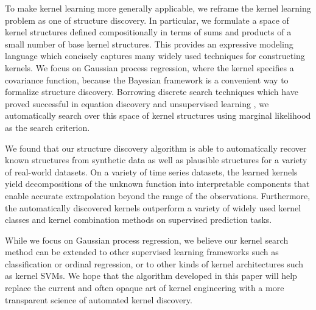 \documentclass[twoside]{article}
\renewcommand{\fTBD}[1]{}
\begin{document}
To make kernel learning more generally applicable, we reframe the kernel learning problem as one of structure discovery.
In particular, we formulate a space of kernel structures defined compositionally in terms of sums and products of a small number of base kernel structures\fTBD{Structures or families?}.
This provides an expressive modeling language which concisely captures many widely used techniques for constructing kernels.
We focus on Gaussian process regression, where the kernel specifies a covariance function, because the Bayesian framework is a convenient way to formalize structure discovery.
Borrowing discrete search techniques which have proved successful in equation discovery \cite{todorovski1997declarative} and unsupervised learning \cite{grosse2012exploiting}, we automatically search over this space of kernel structures using marginal likelihood as the search criterion.

We found that our structure discovery algorithm is able to automatically recover known structures from synthetic data as well as plausible structures for a variety of real-world datasets. 
On a variety of time series datasets, the learned kernels yield decompositions of the unknown function into interpretable components that enable accurate extrapolation beyond the range of the observations.
Furthermore, the automatically discovered kernels outperform a variety of widely used kernel classes and kernel combination methods on supervised prediction tasks.


While we focus on Gaussian process regression, we believe our kernel search method can be extended to other supervised learning frameworks such as classification or ordinal regression, or to other kinds of kernel architectures such as kernel SVMs.
We hope that the algorithm developed in this paper will help replace the current and often opaque art of kernel engineering with a more transparent science of automated kernel discovery.
\end{document}

